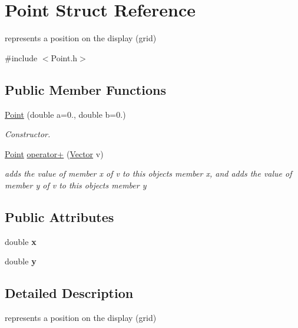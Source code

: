 \hypertarget{struct_point}{}\section{Point Struct Reference}
\label{struct_point}


represents a position on the display (grid)  




{\ttfamily \#include $<$Point.\+h$>$}

\subsection*{Public Member Functions}
\begin{DoxyCompactItemize}
\item 
\mbox{\hyperlink{struct_point_ad426ece2a678805f7f2b9e6e0bfa33d3}{Point}} (double a=0., double b=0.)
\begin{DoxyCompactList}\small\item\em Constructor. \end{DoxyCompactList}\item 
\mbox{\hyperlink{struct_point}{Point}} \mbox{\hyperlink{struct_point_a863eb9e840f8a70ab262f57dd5012f9e}{operator+}} (\mbox{\hyperlink{struct_vector}{Vector}} v)
\begin{DoxyCompactList}\small\item\em adds the value of member x of v to this objects member x, and adds the value of member y of v to this objects member y \end{DoxyCompactList}\end{DoxyCompactItemize}
\subsection*{Public Attributes}
\begin{DoxyCompactItemize}
\item 
\mbox{\label{struct_point_ab99c56589bc8ad5fa5071387110a5bc7}} 
double {\bfseries x}
\item 
\mbox{\label{struct_point_afa38be143ae800e6ad69ce8ed4df62d8}} 
double {\bfseries y}
\end{DoxyCompactItemize}


\subsection{Detailed Description}
represents a position on the display (grid) 


